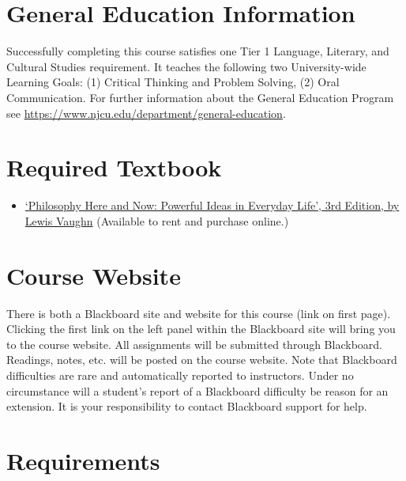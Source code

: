 \documentclass[article,oneside]{memoir}
\begin{document}
\section{General Education Information} 
Successfully completing this course satisfies one Tier 1 Language, Literary, and Cultural Studies requirement. It teaches the following two University-wide Learning Goals: (1) Critical Thinking and Problem Solving, (2) Oral Communication. For further information about the General Education Program see \href{https://www.njcu.edu/department/general-education}{https://www.njcu.edu/department/general-education}.


\section{Required Textbook}

\begin{itemize}
\item
  \href{https://www.vitalsource.com/products/philosophy-here-and-now-lewis-vaughn-v9780190852351}{`Philosophy  Here and Now: Powerful Ideas in Everyday Life', 3rd Edition, by Lewis Vaughn}  (Available to rent and purchase online.)
\end{itemize}


\section{Course Website}
There is both a Blackboard site and website for this course (link on first page). Clicking the first link on the left panel within the Blackboard site will bring you to the course website. All assignments will be submitted through Blackboard. Readings, notes, etc. will be posted on the course website. Note that Blackboard difficulties are rare and automatically reported to instructors. Under no circumstance will a student's report of a Blackboard difficulty be reason for an extension. It is your responsibility to contact Blackboard support for help.


\section{Requirements}
\end{document}
